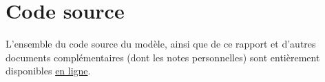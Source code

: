 
\chapter{Code source} %

\label{Code} %

L'ensemble du code source du modèle, ainsi que de ce rapport et d'autres documents complémentaires (dont les notes personnelles) sont entièrement disponibles \href{https://github.com/pierrealbiges/ActiveVision}{en ligne}.